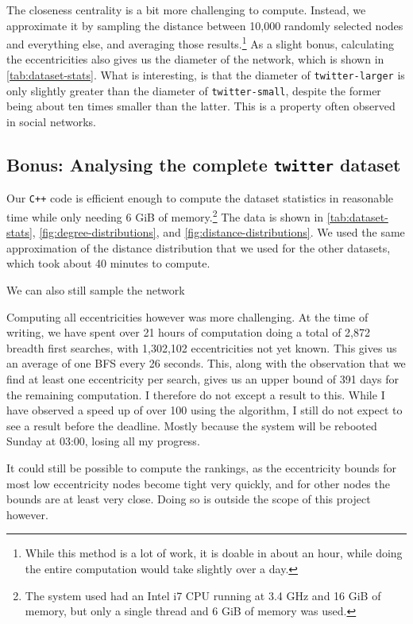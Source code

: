 \documentclass[a4paper,10pt,hidelinks]{article}
\begin{document}
The closeness centrality is a bit more challenging to compute. Instead, we approximate it by sampling the distance between 10,000 randomly selected nodes and everything else, and averaging those results.\footnote{While this method is a lot of work, it is doable in about an hour, while doing the entire computation would take slightly over a day.} As a slight bonus, calculating the eccentricities also gives us the diameter of the network, which is shown in \autoref{tab:dataset-stats}. What is interesting, is that the diameter of \texttt{twitter-larger} is only slightly greater than the diameter of \texttt{twitter-small}, despite the former being about ten times smaller than the latter. This is a property often observed in social networks.

\subsection{Bonus: Analysing the complete \texttt{twitter} dataset}
Our \texttt{C++} code is efficient enough to compute the dataset statistics in reasonable time while only needing 6 GiB of memory.\footnote{The system used had an Intel i7 CPU running at 3.4 GHz and 16 GiB of memory, but only a single thread and 6 GiB of memory was used.} The data is shown in \autoref{tab:dataset-stats}, \autoref{fig:degree-distributions}, and \autoref{fig:distance-distributions}. We used the same approximation of the distance distribution that we used for the other datasets, which took about 40 minutes to compute.

We can also still sample the network 

Computing all eccentricities however was more challenging. At the time of writing, we have spent over 21 hours of computation doing a total of 2,872 breadth first searches, with 1,302,102 eccentricities not yet known. This gives us an average of one BFS every 26 seconds. This, along with the observation that we find at least one eccentricity per search, gives us an upper bound of 391 days for the remaining computation. I therefore do not except a result to this. While I have observed a speed up of over 100 using the algorithm, I still do not expect to see a result before the deadline. Mostly because the system will be rebooted Sunday at 03:00, losing all my progress.

It could still be possible to compute the rankings, as the eccentricity bounds for most low eccentricity nodes become tight very quickly, and for other nodes the bounds are at least very close. Doing so is outside the scope of this project however.
\end{document}
